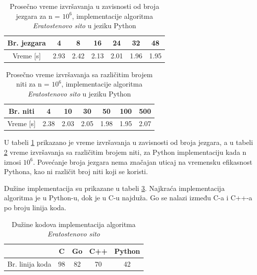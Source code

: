 \documentclass[12pt,oneside]{memoir}
\begin{document}
\begin{table}[H]
\begin{center}
\caption{Prosečno vreme izvršavanja  u zavisnosti od broja jezgara za n = $10^{6}$, implementacije algoritma \textit{Eratostenovo sito} u jeziku Python}
\begin{tabular}{||c||c|c|c|c|c|c||}
\hline
Br. jezgara &4  &8 &16 &24 & 32 &48 \\ \hline
Vreme [s]	&2.93		&2.42		&2.13 	& 2.01	&1.96 	&1.95\\ \hline  
\end{tabular}
\label{tab:prime11}
\end{center}
\end{table}

\begin{table}[H]
\begin{center}
\caption{Prosečno vreme izvršavanja  sa različitim brojem niti za n = $10^{6}$, implementacije algoritma \textit{Eratostenovo sito} u jeziku Python}
\begin{tabular}{||c||c|c|c|c|c|c||}
\hline
Br. niti &4 &10 &30 &50 &100 & 500  \\ \hline
Vreme [s]	&2.38		&2.03		&2.05	 	& 1.98	&1.95		&2.07\\ \hline
\end{tabular}
\label{tab:prime111}
\end{center}
\end{table}

U  tabeli \ref{tab:prime11} prikazano je vreme izvršavanja u zavisnosti od broja jezgara, a u tabeli \ref{tab:prime111} vreme izvršavanja sa različitim brojem niti, za Python implementaciju kada n iznosi $10^{6}$. Povećanje broja jezgara nema značajan uticaj na vremensku efikasnost Pythona, kao ni različit broj niti koji se koristi.

Dužine implementacija su prikazane u tabeli \ref{tab:prime2}. Najkraća implementacija algoritma je u Python-u, dok je u C-u najduža. Go se nalazi između C-a i C++-a po broju linija koda.

\begin{table}[H]
\begin{center}
\caption{Dužine kodova implementacija algoritma \textit{Eratostenovo sito}}
\begin{tabular}{|c|c|c|c|c|}
\hline
		&  C  		&Go 	& C++ & Python 	 \\ \hline
Br. linija koda&98		& 82	&70	&42		 \\ \hline
\end{tabular}
\label{tab:prime2}
\end{center}
\end{table}
\end{document}
